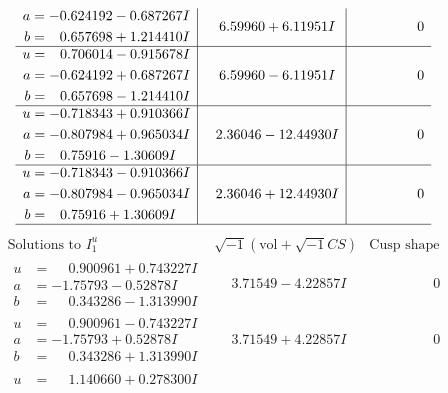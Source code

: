 \documentclass[1p]{elsarticle_modified}
\theoremstyle{definition}
\newcommand{\I}{\sqrt{-1}}
\begin{document}
$$\begin{array}{c|c|c}
\begin{aligned}
a &= -0.624192 - 0.687267 I \\
b &= \phantom{-}0.657698 + 1.214410 I\end{aligned}
 & \phantom{-}6.59960 + 6.11951 I & \phantom{-0.000000 } 0 \\ \hline\begin{aligned}
u &= \phantom{-}0.706014 - 0.915678 I \\
a &= -0.624192 + 0.687267 I \\
b &= \phantom{-}0.657698 - 1.214410 I\end{aligned}
 & \phantom{-}6.59960 - 6.11951 I & \phantom{-0.000000 } 0 \\ \hline\begin{aligned}
u &= -0.718343 + 0.910366 I \\
a &= -0.807984 + 0.965034 I \\
b &= \phantom{-}0.75916 - 1.30609 I\end{aligned}
 & \phantom{-}2.36046 - 12.44930 I & \phantom{-0.000000 } 0 \\ \hline\begin{aligned}
u &= -0.718343 - 0.910366 I \\
a &= -0.807984 - 0.965034 I \\
b &= \phantom{-}0.75916 + 1.30609 I\end{aligned}
 & \phantom{-}2.36046 + 12.44930 I & \phantom{-0.000000 } 0\\
 \hline 
 \end{array}$$\newpage$$\begin{array}{c|c|c}  
\text{Solutions to }I^u_{1}& \I (\text{vol} + \sqrt{-1}CS) & \text{Cusp shape}\\
 \hline 
\begin{aligned}
u &= \phantom{-}0.900961 + 0.743227 I \\
a &= -1.75793 - 0.52878 I \\
b &= \phantom{-}0.343286 - 1.313990 I\end{aligned}
 & \phantom{-}3.71549 - 4.22857 I & \phantom{-0.000000 } 0 \\ \hline\begin{aligned}
u &= \phantom{-}0.900961 - 0.743227 I \\
a &= -1.75793 + 0.52878 I \\
b &= \phantom{-}0.343286 + 1.313990 I\end{aligned}
 & \phantom{-}3.71549 + 4.22857 I & \phantom{-0.000000 } 0 \\ \hline\begin{aligned}
u &= \phantom{-}1.140660 + 0.278300 I \\

\end{aligned}
\end{array}$$
\end{document}
